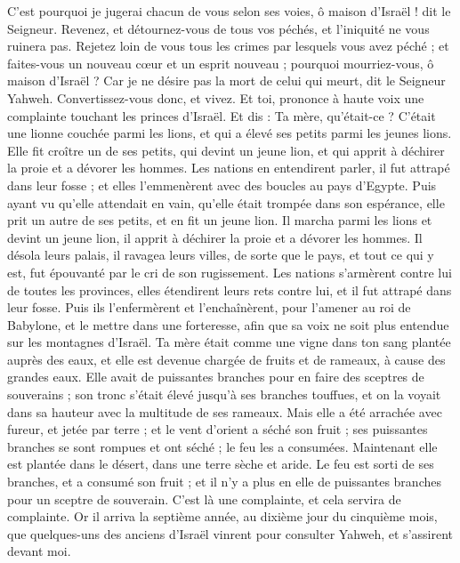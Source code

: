 \begin{multicols}{2}
C'est pourquoi je jugerai chacun de vous selon ses voies, ô maison d'Israël ! dit le Seigneur. Revenez, et détournez-vous de tous vos péchés, et l'iniquité ne vous ruinera pas.
Rejetez loin de vous tous les crimes par lesquels vous avez péché ; et faites-vous un nouveau cœur et un esprit nouveau ; pourquoi mourriez-vous, ô maison d'Israël ?
Car je ne désire pas la mort de celui qui meurt, dit le Seigneur Yahweh. Convertissez-vous donc, et vivez\FTNT{}.
\VerseOne{}Et toi, prononce à haute voix une complainte touchant les princes d'Israël.
Et dis : Ta mère, qu'était-ce ? C'était une lionne couchée parmi les lions, et qui a élevé ses petits parmi les jeunes lions.
Elle fit croître un de ses petits, qui devint un jeune lion, et qui apprit  à déchirer la proie et a dévorer les hommes.
Les nations en entendirent parler, il fut attrapé dans leur fosse ; et elles l’emmenèrent avec des boucles au pays d'Egypte\FTNT{}.
Puis ayant vu qu'elle attendait en vain, qu’elle était trompée dans son espérance, elle prit un autre de ses petits, et en fit un jeune lion.
Il marcha parmi les lions et devint un jeune lion, il apprit à déchirer la proie et a dévorer les hommes.
Il désola leurs palais, il ravagea leurs villes, de sorte que le pays, et tout ce qui y est, fut épouvanté par le cri de son rugissement.
Les nations s’armèrent contre lui de toutes les provinces, elles étendirent leurs rets contre lui, et il fut attrapé dans leur fosse\FTNT{}.
Puis ils l’enfermèrent et l’enchaînèrent, pour l'amener au roi de Babylone, et le mettre dans une forteresse, afin que sa voix ne soit plus entendue sur les montagnes d'Israël.
Ta mère était comme une vigne dans ton sang plantée auprès des eaux, et elle est devenue chargée de fruits et de rameaux, à cause des grandes eaux.
Elle avait de puissantes branches pour en faire des sceptres de souverains ; son tronc s'était élevé jusqu'à ses branches touffues, et on la voyait dans sa hauteur avec la multitude de ses rameaux.
Mais elle a été arrachée avec fureur, et jetée par terre ; et le vent d'orient a séché son fruit ; ses puissantes branches se sont rompues et ont séché ; le feu les a consumées.
Maintenant elle est plantée dans le désert, dans une terre sèche et aride.
Le feu est sorti de ses branches, et a consumé son fruit ; et il n'y a plus en elle de puissantes branches pour un sceptre de souverain. C'est là une complainte, et cela servira de complainte.
\VerseOne{}Or il arriva la septième année, au dixième jour du cinquième mois, que quelques-uns des anciens d'Israël vinrent pour consulter Yahweh, et s'assirent devant moi.

\end{multicols}
